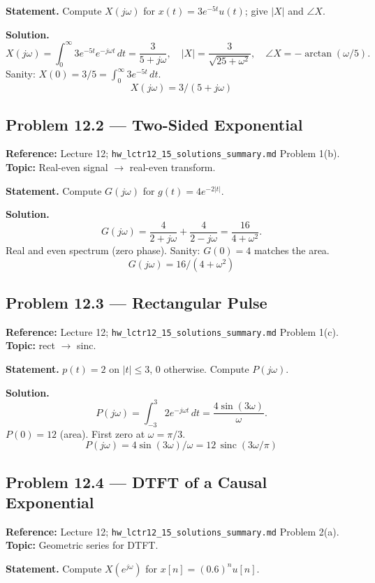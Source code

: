\documentclass[11pt]{article}
\newcommand{\sinc}{\operatorname{sinc}}
\begin{document}
\textbf{Statement.} Compute $X(j\omega)$ for $x(t) = 3 e^{-5t}u(t)$; give $|X|$ and $\angle X$.

\textbf{Solution.}
\[
X(j\omega) = \int_0^\infty 3 e^{-5t}e^{-j\omega t}\,dt = \frac{3}{5+j\omega},\quad |X| = \frac{3}{\sqrt{25+\omega^2}},\quad \angle X = -\arctan(\omega/5).
\]
Sanity: $X(0) = 3/5 = \int_0^\infty 3 e^{-5t}\,dt$. \checkmark
\[
\boxed{\,X(j\omega) = 3/(5+j\omega)\,}
\]

\subsection{Problem 12.2 --- Two-Sided Exponential}
\textbf{Reference:} Lecture 12; \texttt{hw\_lctr12\_15\_solutions\_summary.md} Problem 1(b).\\
\textbf{Topic:} Real-even signal $\to$ real-even transform.

\textbf{Statement.} Compute $G(j\omega)$ for $g(t) = 4 e^{-2|t|}$.

\textbf{Solution.}
\[
G(j\omega) = \frac{4}{2+j\omega} + \frac{4}{2-j\omega} = \frac{16}{4+\omega^2}.
\]
Real and even spectrum (zero phase). Sanity: $G(0)=4$ matches the area. \checkmark
\[
\boxed{\,G(j\omega) = 16/(4+\omega^2)\,}
\]

\subsection{Problem 12.3 --- Rectangular Pulse}
\textbf{Reference:} Lecture 12; \texttt{hw\_lctr12\_15\_solutions\_summary.md} Problem 1(c).\\
\textbf{Topic:} rect $\to$ sinc.

\textbf{Statement.} $p(t) = 2$ on $|t|\le 3$, $0$ otherwise. Compute $P(j\omega)$.

\textbf{Solution.}
\[
P(j\omega) = \int_{-3}^3 2 e^{-j\omega t}\,dt = \frac{4\sin(3\omega)}{\omega}.
\]
$P(0) = 12$ (area). First zero at $\omega=\pi/3$.
\[
\boxed{\,P(j\omega) = 4\sin(3\omega)/\omega = 12\,\sinc(3\omega/\pi)\,}
\]

\subsection{Problem 12.4 --- DTFT of a Causal Exponential}
\textbf{Reference:} Lecture 12; \texttt{hw\_lctr12\_15\_solutions\_summary.md} Problem 2(a).\\
\textbf{Topic:} Geometric series for DTFT.

\textbf{Statement.} Compute $X(e^{j\omega})$ for $x[n] = (0.6)^n u[n]$.
\end{document}
